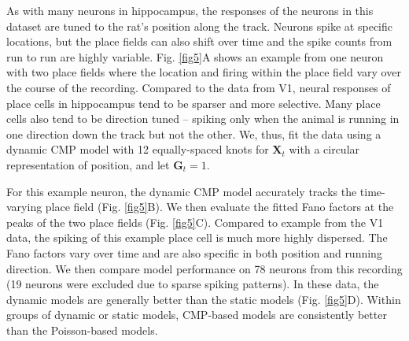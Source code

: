 \documentclass[]{article}
\begin{document}
	As with many neurons in hippocampus, the responses of the neurons in this dataset are tuned to the rat’s position along the track. Neurons spike at specific locations, but the place fields can also shift over time and the spike counts from run to run are highly variable. Fig. \ref{fig5}A shows an example from one neuron with two place fields where the location and firing within the place field vary over the course of the recording. Compared to the data from V1, neural responses of place cells in hippocampus tend to be sparser and more selective. Many place cells also tend to be direction tuned – spiking only when the animal is running in one direction down the track but not the other. We, thus, fit the data using a dynamic CMP model with 12 equally-spaced knots for $\bm{X}_t$ with a circular representation of position, and let $\bm{G}_t=1$.
	
	For this example neuron, the dynamic CMP model accurately tracks the time-varying place field (Fig. \ref{fig5}B). We then evaluate the fitted Fano factors at the peaks of the two place fields (Fig. \ref{fig5}C). Compared to example from the V1 data, the spiking of this example place cell is much more highly dispersed. The Fano factors vary over time and are also specific in both position and running direction. We then compare model performance on 78 neurons from this recording (19 neurons were excluded due to sparse spiking patterns). In these data, the dynamic models are generally better than the static models (Fig. \ref{fig5}D). Within groups of dynamic or static models, CMP-based models are consistently better than the Poisson-based models.
	
\end{document}
